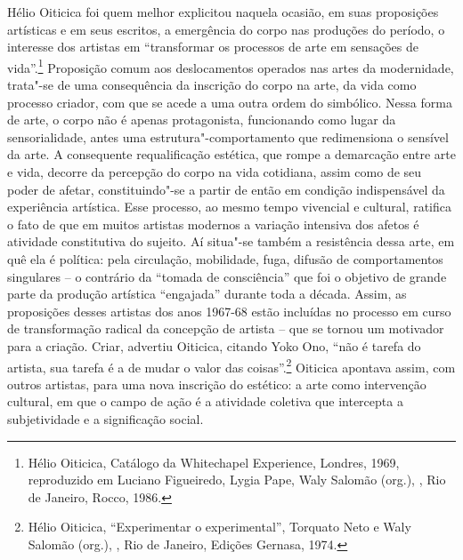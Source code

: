 Hélio Oiticica foi quem melhor explicitou naquela ocasião, em suas
proposições artísticas e em seus escritos, a emergência do corpo nas
produções do período, o interesse dos artistas em ``transformar os
processos de arte em sensações de vida''.\footnote{Hélio Oiticica,
  Catálogo da Whitechapel Experience, Londres, 1969, reproduzido em
  Luciano Figueiredo, Lygia Pape, Waly Salomão (org.), {},
Rio de Janeiro, Rocco, 1986.} Proposição comum aos
deslocamentos operados nas artes da modernidade, trata"-se de uma
consequência da inscrição do corpo na arte, da vida como processo
criador, com que se acede a uma outra ordem do simbólico. Nessa forma de
arte, o corpo não é apenas protagonista, funcionando como lugar da
sensorialidade, antes uma estrutura"-comportamento que redimensiona o
sensível da arte. A consequente requalificação estética, que rompe a
demarcação entre arte e vida, decorre da percepção do corpo na vida
cotidiana, assim como de seu poder de afetar, constituindo"-se a partir
de então em condição indispensável da experiência artística. Esse
processo, ao mesmo tempo vivencial e cultural, ratifica o fato de que em
muitos artistas modernos a variação intensiva dos afetos é atividade
constitutiva do sujeito. Aí situa"-se também a resistência dessa arte, em
quê ela é política: pela circulação, mobilidade, fuga, difusão de
comportamentos singulares -- o contrário da ``tomada de consciência''
que foi o objetivo de grande parte da produção artística ``engajada''
durante toda a década. Assim, as proposições desses artistas dos anos
1967-68 estão incluídas no processo em curso de transformação radical da
concepção de artista -- que se tornou um motivador para a criação.
Criar, advertiu Oiticica, citando Yoko Ono, ``não é tarefa do artista,
sua tarefa é a de mudar o valor das coisas''.\footnote{Hélio Oiticica,
  ``Experimentar o experimental'', Torquato Neto e Waly Salomão (org.),
{}, Rio de Janeiro, Edições Gernasa, 1974.} Oiticica
apontava assim, com outros artistas, para uma nova inscrição do
estético: a arte como intervenção cultural, em que o campo de ação é a
atividade coletiva que intercepta a subjetividade e a significação
social.

